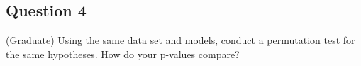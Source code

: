 \subsection{Question 4}

\begin{question}
    (Graduate) Using the same data set and models, conduct a permutation test for the same hypotheses. How do your p-values compare?
\end{question}

\begin{answer}
    
\end{answer}